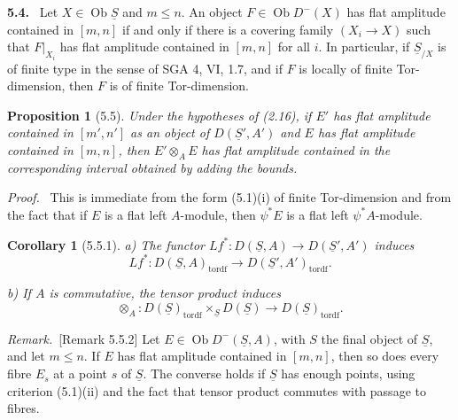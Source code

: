 \documentclass[11pt]{article}
\theoremstyle{plain}
\newtheorem*{proposition*}{Proposition}
\newtheorem*{corollary*}{Corollary}
\theoremstyle{definition}
\theoremstyle{remark}
\newenvironment{statement}[1]{\par\medskip\noindent\textbf{#1.}\ }{\par\medskip}
\newenvironment{prooftext}{\par\noindent\textit{Proof.}\ }{\par\medskip}
\newenvironment{remarktext}{\par\medskip\noindent\textit{Remark.}\ }{\par\medskip}
\DeclareMathOperator{\ob}{Ob}
\providecommand{\uS}{\underline{S}}
\begin{document}
\begin{statement}{5.4}
Let $X\in\ob\uS$ and $m\leq n$. An object $F\in\ob D^-(X)$ has flat amplitude contained in $[m,n]$ if and only if there is a covering family $(X_i\to X)$ such that $F|_{X_i}$ has flat amplitude contained in $[m,n]$ for all $i$. In particular, if $\uS_{/X}$ is of finite type in the sense of SGA 4, VI, 1.7, and if $F$ is locally of finite Tor-dimension, then $F$ is of finite Tor-dimension.
\end{statement}

\begin{proposition*}[5.5]
Under the hypotheses of (2.16), if $E'$ has flat amplitude contained in $[m',n']$ as an object of $D(\uS',A')$ and $E$ has flat amplitude contained in $[m,n]$, then $E'\otimes_AE$ has flat amplitude contained in the corresponding interval obtained by adding the bounds.
\end{proposition*}

\begin{prooftext}
This is immediate from the form (5.1)(i) of finite Tor-dimension and from the fact that if $E$ is a flat left $A$-module, then $\psi^*E$ is a flat left $\psi^*A$-module.
\end{prooftext}

\begin{corollary*}[5.5.1]
\textup{a)} The functor $Lf^*:D(\uS,A)\to D(\uS',A')$ induces
\[
Lf^*:D(\uS,A)_{\mathrm{tordf}}
\longrightarrow D(\uS',A')_{\mathrm{tordf}}.
\]

\textup{b)} If $A$ is commutative, the tensor product induces
\[
\otimes_A:D(\uS)_{\mathrm{tordf}}\times_{\uS}D(\uS)
\longrightarrow D(\uS)_{\mathrm{tordf}}.
\]
\end{corollary*}

\begin{remarktext}[Remark 5.5.2]
Let $E\in\ob D^-(\uS,A)$, with $S$ the final object of $\uS$, and let $m\leq n$. If $E$ has flat amplitude contained in $[m,n]$, then so does every fibre $E_s$ at a point $s$ of $\uS$. The converse holds if $\uS$ has enough points, using criterion (5.1)(ii) and the fact that tensor product commutes with passage to fibres.
\end{remarktext}
\end{document}
